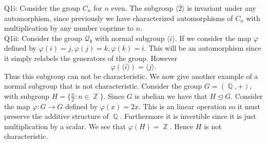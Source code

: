 \documentclass[letterpaper]{article}
\DeclareMathOperator{\Z}{\mathbb{Z}}
\DeclareMathOperator{\Q}{\mathbb{Q}}
\newcommand{\normal}{\trianglelefteq}
\newcommand{\lan}{\langle}
\newcommand{\ran}{\rangle}
\newcommand{\inn}[1]{\lan#1\ran}
\newcommand{\ol}{\overline}
\begin{document}
\noindent Q1i: Consider the group $C_n$ for $n$ even. The subgroup $\inn{\ol{2}}$ is invariant under any automorphism, since previously we have characterized automorphisms of $C_n$ with multiplication by any number coprime to $n$.
\newline \\ Q1ii: Consider the group $\mathcal{Q}_8$ with normal subgroup $\inn{i}$. If we consider the map $\varphi$ defined by $\varphi(i)=j, \varphi(j)=k, \varphi(k)=i$. This will be an automorphism since it simply relabels the generators of the group. However $$\varphi(\inn{i}) = \inn{j}. $$ Thus this subgroup can not be characteristic.
We now give another example of a normal subgroup that is not characteristic. Consider the group $G = (\Q, +)$, with subgroup $H = \{\frac{n}{2}: n\in \Z \}$. Since $G$ is abelian we have that $H \normal G$. Consider the map $\varphi:G \to G$ defined by $\varphi(x) = 2x$. This is an linear operation so it must preserve the additive structure of $\Q$. Furthermore it is invertible since it is just multiplication by a scalar. We see that $\varphi(H) = \Z$. Hence $H$ is not characteristic. 
\end{document}
